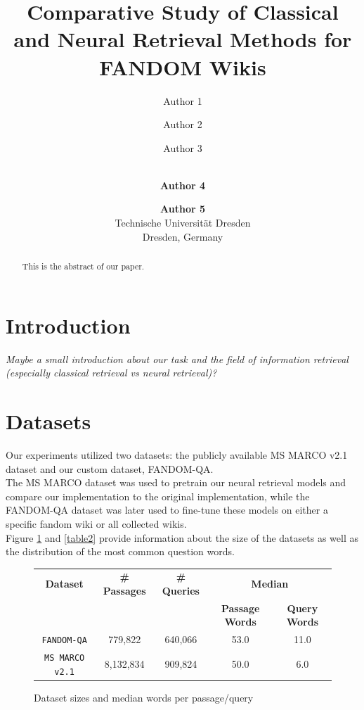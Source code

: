\documentclass[11pt]{article}
\title{
Comparative Study of Classical and Neural Retrieval Methods for FANDOM Wikis
}
\author{
Author 1 \and Author 2 \and Author 3 \and \\
{\bf Author 4} \and {\bf Author 5} \\
Technische Universität Dresden \\ Dresden, Germany
}
\begin{document}
\maketitle
\begin{abstract}
This is the abstract of our paper.
\end{abstract}


\section{Introduction}
\textit{Maybe a small introduction about our task and the field of information retrieval (especially classical retrieval vs neural retrieval)?}


\section{Datasets}
Our experiments utilized two datasets: the publicly available MS MARCO v2.1 \cite{bajaj2018ms} dataset and our custom dataset, FANDOM-QA. \\
The MS MARCO dataset was used to pretrain our neural retrieval models and compare our implementation to the original implementation, while the FANDOM-QA dataset was later used to fine-tune these models on either a specific fandom wiki or all collected wikis. \\
Figure \ref{table1} and \ref{table2} provide information about the size of the datasets as well as the distribution of the most common question words.

\begin{figure}
    \centering

    \caption{Dataset sizes and median words per passage/query}
    \setlength{\tabcolsep}{4pt} %
    \begin{tabular}{ccccc}
    \hline
    \textbf{Dataset} & \textbf{\# Passages} & \textbf{\# Queries} & \multicolumn{2}{c}{\textbf{Median}} \\
    & & & \textbf{Passage Words} & \textbf{Query Words} \\
    \hline
    \texttt{FANDOM-QA} & 779,822 & 640,066 & 53.0 & 11.0 \\
    \texttt{MS MARCO v2.1} & 8,132,834 & 909,824 & 50.0 & 6.0 \\
    \hline
    \end{tabular}
        \label{table1}
\end{figure}
\end{document}
